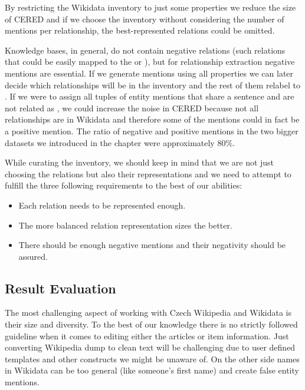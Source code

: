 By restricting the Wikidata inventory to just some properties we reduce the size of CERED and if we choose the inventory without considering the number of mentions per relationship, the best-represented relations could be omitted.

Knowledge bases, in general, do not contain negative relations (such relations that could be easily mapped to the  or ), but for relationship extraction negative mentions are essential. If we generate mentions using all properties we can later decide which relationships will be in the inventory and the rest of them relabel to . If we were to assign all tuples of entity mentions that share a sentence and are not related as , we could increase the noise in CERED because not all relationships are in Wikidata and therefore some of the  mentions could in fact be a positive mention. The ratio of negative and positive mentions in the two bigger datasets we introduced in the  chapter were approximately 80\%.

While curating the inventory, we should keep in mind that we are not just choosing the relations but also their representations and we need to attempt to fulfill the three following requirements to the best of our abilities:
\begin{itemize}
\item Each relation needs to be represented enough.
\item The more balanced relation representation sizes the better.
\item There should be enough negative mentions and their negativity should be assured. 

\end{itemize}

\subsection{Result Evaluation}
The most challenging aspect of working with Czech Wikipedia and Wikidata is their size and diversity. To the best of our knowledge there is no strictly followed guideline when it comes to editing either the articles or item information. Just converting Wikipedia dump to clean text will be challenging due to user defined templates and other constructs we might be unaware of. On the other side names in Wikidata can be too general (like someone's first name) and create false entity mentions. 

